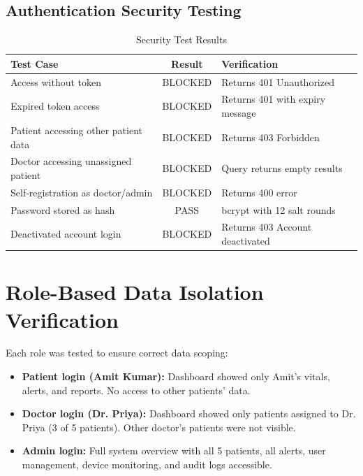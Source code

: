 \documentclass[12pt,a4paper]{report}
\begin{document}
\subsection{Authentication Security Testing}
\begin{table}[H]
\centering
\caption{Security Test Results}
\label{tab:security}
\begin{tabular}{|p{5cm}|c|p{5cm}|}
\hline
\textbf{Test Case} & \textbf{Result} & \textbf{Verification} \\
\hline
Access without token & BLOCKED & Returns 401 Unauthorized \\
\hline
Expired token access & BLOCKED & Returns 401 with expiry message \\
\hline
Patient accessing other patient data & BLOCKED & Returns 403 Forbidden \\
\hline
Doctor accessing unassigned patient & BLOCKED & Query returns empty results \\
\hline
Self-registration as doctor/admin & BLOCKED & Returns 400 error \\
\hline
Password stored as hash & PASS & bcrypt with 12 salt rounds \\
\hline
Deactivated account login & BLOCKED & Returns 403 Account deactivated \\
\hline
\end{tabular}
\end{table}

\section{Role-Based Data Isolation Verification}
Each role was tested to ensure correct data scoping:
\begin{itemize}[leftmargin=*]
    \item \textbf{Patient login (Amit Kumar):} Dashboard showed only Amit's vitals, alerts, and reports. No access to other patients' data.
    \item \textbf{Doctor login (Dr. Priya):} Dashboard showed only patients assigned to Dr. Priya (3 of 5 patients). Other doctor's patients were not visible.
    \item \textbf{Admin login:} Full system overview with all 5 patients, all alerts, user management, device monitoring, and audit logs accessible.
\end{itemize}
\end{document}
